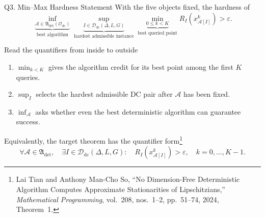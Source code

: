 \documentclass[10pt]{beamer}
\begin{document}
\begin{frame}{Q3. Min--Max Hardness Statement}
\footnotesize
With the five objects fixed, the hardness of 
\[
\underbrace{\inf_{\mathcal A\in\mathfrak A_{\mathrm{det}}(\mathcal O_{\mathrm{dc}})}}_
{\text{best algorithm}}
\underbrace{\sup_{I\in\mathcal D_{\mathrm{dc}}(\Delta,L,G)}}_
{\text{hardest admissible instance}}
\underbrace{\min_{0\le k<K}}_{\text{best queried point}}
R_I\!\left(x_{\mathcal A[I]}^k\right)
>\varepsilon.
\]

\begin{block}{Read the quantifiers from inside to outside}
\begin{enumerate}\setlength{\itemsep}{3pt}
    \item $\min_{k<K}$ gives the algorithm credit for its best point among
    the first $K$ queries.
    \item $\sup_I$ selects the hardest admissible DC pair after
    $\mathcal A$ has been fixed.
    \item $\inf_{\mathcal A}$ asks whether even the best deterministic
    algorithm can guarantee success.
\end{enumerate}
\end{block}

Equivalently, the target theorem has the quantifier form\footnote{\footnotesize Lai Tian and Anthony Man-Cho So,
``No Dimension-Free Deterministic Algorithm Computes Approximate
Stationarities of Lipschitzians,'' \emph{Mathematical Programming},
vol.~208, nos.~1--2, pp.~51--74, 2024, Theorem~1.}
\[
\forall\mathcal A\in\mathfrak A_{\mathrm{det}},\quad
\exists I\in\mathcal D_{\mathrm{dc}}(\Delta,L,G):\quad
R_I\!\left(x_{\mathcal A[I]}^k\right)>\varepsilon,
\quad k=0,\ldots,K-1.
\]


\end{frame}
\end{document}
